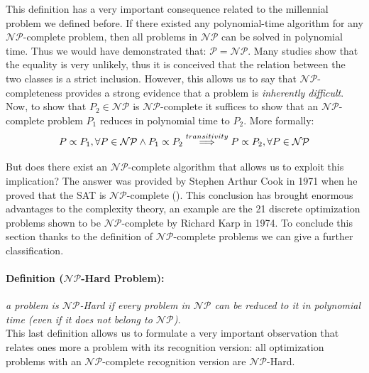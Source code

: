 \documentclass[english]{article}
\begin{document}
			 This definition has a very important consequence related to the millennial problem we defined before. If there existed any polynomial-time algorithm for any $\mathcal{N}\mathcal{P}$-complete problem, then all problems in $\mathcal{N}\mathcal{P}$ can be solved in polynomial time. Thus we would have demonstrated that: $\mathcal{P}=\mathcal{N}\mathcal{P}$. Many studies show that the equality is very unlikely, thus it is conceived that the relation between the two classes is a strict inclusion. However, this allows us to say that $\mathcal{N}\mathcal{P}$-completeness provides a strong evidence that a problem is \emph{inherently difficult}. Now, to show that $P_2\in\mathcal{N}\mathcal{P}$ is $\mathcal{N}\mathcal{P}$-complete it suffices to show that an $\mathcal{N}\mathcal{P}$-complete problem $P_1$ reduces in polynomial time to $P_2$. More formally:
			 \begin{equation*}
			 	\centering
			 	P\propto P_1, \forall P\in\mathcal{N}\mathcal{P} \land P_1 \propto P_2 \overset{transitivity}{\implies} P\propto P_2, \forall P\in \mathcal{N}\mathcal{P}
			 \end{equation*}
			 
			 But does there exist an $\mathcal{N}\mathcal{P}$-complete algorithm that allows us to exploit this implication? The answer was provided by Stephen Arthur Cook in 1971 when he proved that the SAT is $\mathcal{N}\mathcal{P}$-complete (\cite{CookSAT}). This conclusion has brought enormous advantages to the complexity theory, an example are the 21 discrete optimization problems shown to be $\mathcal{N}\mathcal{P}$-complete by Richard Karp in 1974. To conclude this section thanks to the definition of $\mathcal{N}\mathcal{P}$-complete problems we can give a further classification.
			 
			 \paragraph{Definition ($\mathcal{N}\mathcal{P}$-Hard Problem):} \emph{a problem is $\mathcal{N}\mathcal{P}$-Hard if every problem in $\mathcal{N}\mathcal{P}$ can be reduced to it in polynomial time (even if it does not belong to $\mathcal{N}\mathcal{P}$).} \\
			 
			 This last definition allows us to formulate a very important observation that relates ones more a problem with its recognition version: all optimization problems with an $\mathcal{N}\mathcal{P}$-complete recognition version are $\mathcal{N}\mathcal{P}$-Hard.
			 
\end{document}
